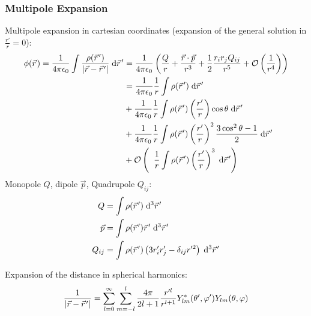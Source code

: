 		\subsubsection{Multipole Expansion}
			\noindent
			Multipole expansion in cartesian coordinates (expansion of the general solution in $\frac{r'}{r}=0$):
			\begin{equation}
				\begin{aligned}
					\phi(\pvec{r}) = \frac{1}{4\pi\epsilon_0}\int\frac{\rho(\pvec{r}')}{\left|\vec{r}-\pvec{r}'\right|}\;\diff \pvec{r}'
					&= \frac{1}{4\pi\epsilon_0}\left(\frac{Q}{r} + \frac{\vec{r}\cdot\vec{p}}{r^3} + \frac{1}{2}\frac{r_i r_j Q_{ij}}{r^5} + \mathcal{O} \left(\frac{1}{r^4}\right)\right) \\
					&= \frac{1}{4\pi\epsilon_0}\frac{1}{r}\int\rho(\pvec{r}')\;\diff \pvec{r}' \\
					&+ \frac{1}{4\pi\epsilon_0}\frac{1}{r}\int\rho(\pvec{r}')\left(\frac{r'}{r}\right)\cos\theta\;\diff \pvec{r}' \\
					&+ \frac{1}{4\pi\epsilon_0}\frac{1}{r}\int\rho(\pvec{r}')\left(\frac{r'}{r}\right)^2\frac{3\cos^2\theta-1}{2}\;\diff \pvec{r}' \\
					&+ \mathcal{O}\left(\;\;\frac{1}{r}\int\rho(\pvec{r}')\left(\frac{r'}{r}\right)^3 \;\diff \pvec{r}'\right) \\
				\end{aligned}
			\end{equation}
			Monopole $Q$, dipole $\vec{p}$, Quadrupole $Q_{ij}$:
			\begin{equation}
				\begin{aligned}
					Q &= \int \rho(\pvec{r}') \;\diff^3 \pvec{r}' \\
					\vec{p} &= \int \rho(\pvec{r}')\pvec{r}' \;\diff^3 \pvec{r}' \\
					Q_{ij} &= \int \rho(\pvec{r}')\left(3r'_i r'_j - \delta_{ij} r'^2 \right)	\;\diff^3 \pvec{r}' \\
				\end{aligned}
			\end{equation}

			\noindent
			Expansion of the distance in spherical harmonics:
			\begin{equation}
				\frac{1}{\left|\vec{r}-\pvec{r}'\right|}=\sum_{l=0}^{\infty}\sum_{m=-l}^{l} \frac{4\pi}{2l+1}\frac{r'^l}{r^{l+1}} Y^{*}_{lm}(\theta',\varphi')Y_{lm}(\theta,\varphi)
			\end{equation}

